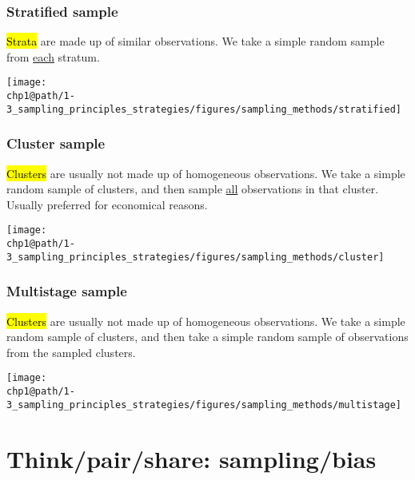 \documentclass[slidestop,compress,mathserif]{beamer}
\makeatletter
\def\chp1@path{../../Chp 1}
\makeatother
\begin{document}

\begin{frame}
	\frametitle{Stratified sample}

	\hl{Strata} are made up of similar observations. We take a simple random sample from \underline{each} stratum.

	\begin{center}
	\texttt{[image: \\chp1@path/1-3\_sampling\_principles\_strategies/figures/sampling\_methods/stratified]}
	\end{center}

\end{frame}


\begin{frame}
	\frametitle{Cluster sample}

	\hl{Clusters} are usually not made up of homogeneous observations. We take a simple random sample of clusters, and then sample \underline{all} observations in that cluster. Usually preferred for economical reasons.

	\begin{center}
	\texttt{[image: \\chp1@path/1-3\_sampling\_principles\_strategies/figures/sampling\_methods/cluster]}
	\end{center}

\end{frame}


\begin{frame}
	\frametitle{Multistage sample}

	\hl{Clusters} are usually not made up of homogeneous observations.  We take a simple random sample of clusters, and then take a simple random sample of observations from the sampled clusters.

	\begin{center}
	\texttt{[image: \\chp1@path/1-3\_sampling\_principles\_strategies/figures/sampling\_methods/multistage]}
	\end{center}

\end{frame}


\section{Think/pair/share: sampling/bias}
\end{document}
